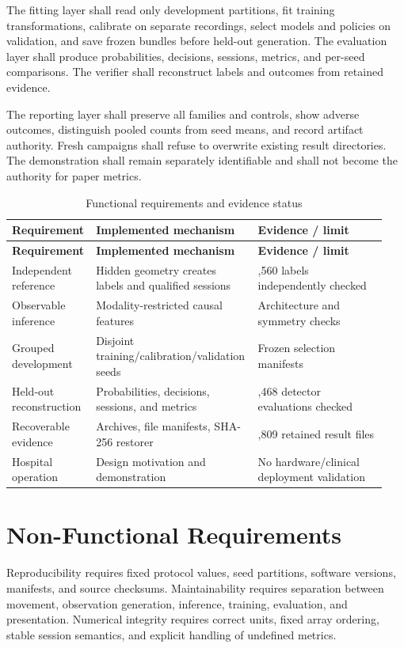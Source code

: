 \documentclass[12pt,a4paper]{report}
\begin{document}
The fitting layer shall read only development partitions, fit training transformations, calibrate on separate recordings, select models and policies on validation, and save frozen bundles before held-out generation. The evaluation layer shall produce probabilities, decisions, sessions, metrics, and per-seed comparisons. The verifier shall reconstruct labels and outcomes from retained evidence.

The reporting layer shall preserve all families and controls, show adverse outcomes, distinguish pooled counts from seed means, and record artifact authority. Fresh campaigns shall refuse to overwrite existing result directories. The demonstration shall remain separately identifiable and shall not become the authority for paper metrics.

\begingroup
\small{}\setlength{\tabcolsep}{3pt}
\begin{longtable}{>{\raggedright\arraybackslash}p{0.200\linewidth}>{\raggedright\arraybackslash}p{0.400\linewidth}>{\raggedright\arraybackslash}p{0.340\linewidth}}
\caption{Functional requirements and evidence status}\label{tab:requirements}\\
\toprule
\textbf{Requirement} & \textbf{Implemented mechanism} & \textbf{Evidence / limit}\\
\midrule
\endfirsthead
\toprule
\textbf{Requirement} & \textbf{Implemented mechanism} & \textbf{Evidence / limit}\\
\midrule
\endhead
\bottomrule
\endfoot
Independent reference & Hidden geometry creates labels and qualified sessions & 826,560 labels independently checked\\
Observable inference & Modality-restricted causal features & Architecture and symmetry checks\\
Grouped development & Disjoint training/\allowbreak{}calibration/\allowbreak{}validation seeds & Frozen selection manifests\\
Held-out reconstruction & Probabilities, decisions, sessions, and metrics & 6,468 detector evaluations checked\\
Recoverable evidence & Archives, file manifests, SHA-256 restorer & 3,809 retained result files\\
Hospital operation & Design motivation and demonstration & No hardware/\allowbreak{}clinical deployment validation\\
\end{longtable}
\endgroup


\section{Non-Functional Requirements}
Reproducibility requires fixed protocol values, seed partitions, software versions, manifests, and source checksums. Maintainability requires separation between movement, observation generation, inference, training, evaluation, and presentation. Numerical integrity requires correct units, fixed array ordering, stable session semantics, and explicit handling of undefined metrics.
\end{document}
